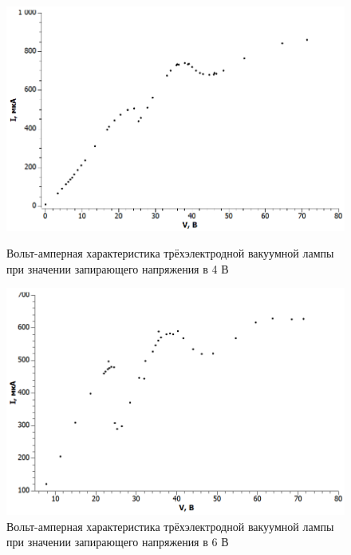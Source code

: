 \documentclass[a4paper, 12pt]{article}%
\begin{document}
\begin{enumerate}
\begin{figure}[h]
\begin{center}
\begin{minipage}[h]{0.45\linewidth}
\includegraphics[width=1\linewidth]{images/graph_4.png}
\caption{Вольт-амперная характеристика трёхэлектродной вакуумной лампы при значении запирающего напряжения в 4 В} %
\label{ris:experimoriginal} %
\end{minipage}
\hfill 
\begin{minipage}[h]{0.45\linewidth}
\includegraphics[width=1\linewidth]{images/graph_6.png}
\caption{Вольт-амперная характеристика трёхэлектродной вакуумной лампы при значении запирающего напряжения в 6 В}
\label{ris:experimcoded}
\end{minipage}
\hfill 
\begin{minipage}[h]{0.45\linewidth}

\end{minipage}
\end{center}
\end{figure}
\end{enumerate}
\end{document}
